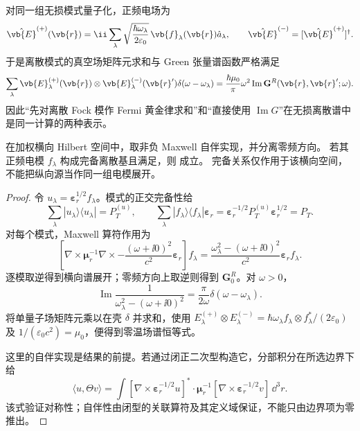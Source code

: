 对同一组无损模式量子化，正频电场为
\begin{equation}
\hat{\vb{E}}^{(+)}(\vb{r})
=\ii\sum_\lambda
\sqrt{\frac{\hbar\omega_\lambda}{2\varepsilon_0}}
\,\vb{f}_\lambda(\vb{r})\hat a_\lambda,
\qquad
\hat{\vb{E}}^{(-)}=[\hat{\vb{E}}^{(+)}]^\dagger .
\label{eq:lossless_quantized_electric_mode_expansion}
\end{equation}
于是离散模式的真空场矩阵元求和与 Green 张量谱函数严格满足
\begin{equation}
{
\sum_\lambda
\vb{E}_\lambda^{(+)}(\vb{r})\otimes
\vb{E}_\lambda^{(-)}(\vb{r}')
\delta(\omega-\omega_\lambda)
=\frac{\hbar\mu_0}{\pi}\omega^2
\operatorname{Im}\mathbf G^R(\vb{r},\vb{r}';\omega).}
\label{eq:lossless_mode_sum_to_green_fdt_zeroT}
\end{equation}
因此“先对离散 Fock 模作 Fermi 黄金律求和”和“直接使用 $\operatorname{Im}G$”在无损离散谱中是同一计算的两种表示。

\begin{proposition}[无损横向模式与零温场谱]
在加权横向 Hilbert 空间中，取非负 Maxwell 自伴实现，并分离零频方向。
若其正频电模 $f_\lambda$ 构成完备离散基且满足，则
 成立。
完备关系仅作用于该横向空间，不能把纵向源当作同一组电模展开。
\end{proposition}
\begin{proof}
令 $u_\lambda=\boldsymbol\varepsilon_r^{1/2}f_\lambda$。模式的正交完备性给
\[
\sum_\lambda|u_\lambda\rangle\langle u_\lambda|=P_T^{(u)},\qquad
\sum_\lambda|f_\lambda\rangle\langle f_\lambda|\boldsymbol\varepsilon_r
=\boldsymbol\varepsilon_r^{-1/2}P_T^{(u)}\boldsymbol\varepsilon_r^{1/2}=P_T.
\]
对每个模式，Maxwell 算符作用为
\[
\left[\nabla\times\boldsymbol\mu_r^{-1}\nabla\times
-\frac{(\omega+\ii0)^2}{c^2}\boldsymbol\varepsilon_r\right]f_\lambda
=\frac{\omega_\lambda^2-(\omega+\ii0)^2}{c^2}\boldsymbol\varepsilon_r f_\lambda.
\]
逐模取逆得到横向谱展开；零频方向上取逆则得到 $\mathbf G_0^R$。对 $\omega>0$，
\[
\operatorname{Im}\frac1{\omega_\lambda^2-(\omega+\ii0)^2}
=\frac\pi{2\omega}\delta(\omega-\omega_\lambda).
\]
将单量子场矩阵元乘以在壳 $\delta$ 并求和，使用
$E_\lambda^{(+)}\otimes E_\lambda^{(-)}=
\hbar\omega_\lambda f_\lambda\otimes f_\lambda^*/(2\varepsilon_0)$
及 $1/(\varepsilon_0c^2)=\mu_0$，便得到零温场谱恒等式。

这里的自伴实现是结果的前提。若通过闭正二次型构造它，分部积分在所选边界下给
\[
\langle u,\Theta v\rangle
=\int[\nabla\times\boldsymbol\varepsilon_r^{-1/2}u]^*
\cdot\boldsymbol\mu_r^{-1}[\nabla\times\boldsymbol\varepsilon_r^{-1/2}v]\,\dd^3r.
\]
该式验证对称性；自伴性由闭型的关联算符及其定义域保证，不能只由边界项为零推出。
\end{proof}

